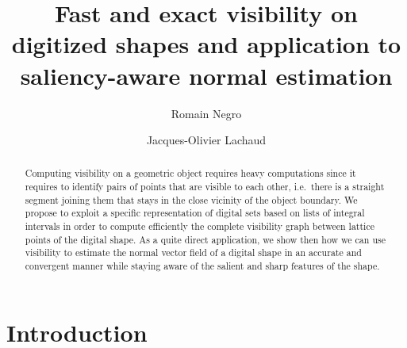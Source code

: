 \documentclass[runningheads]{llncs}
\begin{document}
%
    \title{Fast and exact visibility on digitized shapes and application to saliency-aware normal estimation}
%
%
    \author{Romain Negro \and
    Jacques-Olivier Lachaud}
%
%
%
    \maketitle              %
%
    \begin{abstract}
        Computing visibility on a geometric object requires heavy
        computations since it requires to identify pairs of points that
        are visible to each other, i.e.\ there is a straight segment
        joining them that stays in the close vicinity of the object
        boundary. We propose to exploit a specific representation of
        digital sets based on lists of integral intervals in order to
        compute efficiently the complete visibility graph between
        lattice points of the digital shape. As a quite direct
        application, we show then how we can use visibility to estimate
        the normal vector field of a digital shape in an accurate and
        convergent manner while staying aware of the salient and sharp features of
        the shape.

    \end{abstract}



    \section{Introduction}
\end{document}
